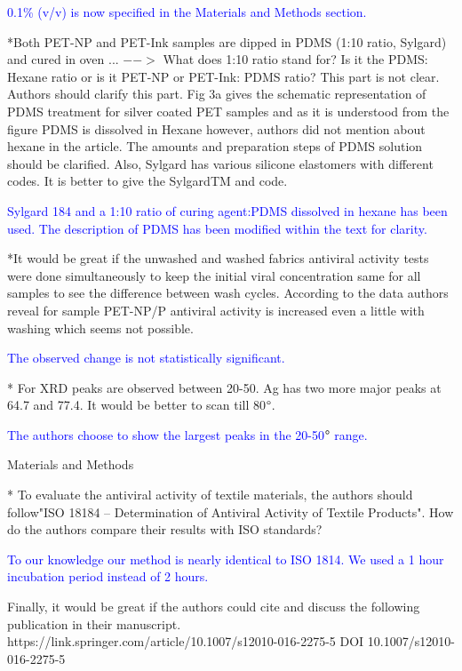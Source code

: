 \documentclass[12pt]{letter}
\newcommand{\blue}[1]{\textcolor{blue}{#1}} %
\begin{document}
\blue{0.1\% (v/v) is now specified in the Materials and Methods section. }

*Both PET-NP and PET-Ink samples are dipped in PDMS (1:10 ratio, Sylgard) and cured in oven ... $-->$ What does 1:10 ratio stand for? Is it the PDMS: Hexane ratio or is it PET-NP or PET-Ink: PDMS ratio? This part is not clear. Authors should clarify this part. Fig 3a gives the schematic representation of PDMS treatment for silver coated PET samples and as it is understood from the figure PDMS is dissolved in Hexane however, authors did not mention about hexane in the article. The amounts and preparation steps of PDMS solution should be clarified. Also, Sylgard has various silicone elastomers with different codes. It is better to give the SylgardTM and code.

\blue{Sylgard 184 and a 1:10 ratio of curing agent:PDMS dissolved in hexane has been used. The description of PDMS has been modified within the text for clarity. }

*It would be great if the unwashed and washed fabrics antiviral activity tests were done simultaneously to keep the initial viral concentration same for all samples to see the difference between wash cycles. According to the data authors reveal for sample PET-NP/P antiviral activity is increased even a little with washing which seems not possible.

\blue{The observed change is not statistically significant.}

* For XRD peaks are observed between 20-50. Ag has two more major peaks at 64.7 and 77.4. It would be better to scan till 80$\degree$.

\blue{The authors choose to show the largest peaks in the 20-50$\degree$ range. }

Materials and Methods

* To evaluate the antiviral activity of textile materials, the authors should follow"ISO 18184 – Determination of Antiviral Activity of Textile Products". How do the authors compare their results with ISO standards?

\blue{To our knowledge our method is nearly identical to ISO 1814. We used a 1 hour incubation period instead of 2 hours.}

Finally, it would be great if the authors could cite and discuss the following publication in their manuscript. https://link.springer.com/article/10.1007/s12010-016-2275-5
DOI 10.1007/s12010-016-2275-5
\end{document}
